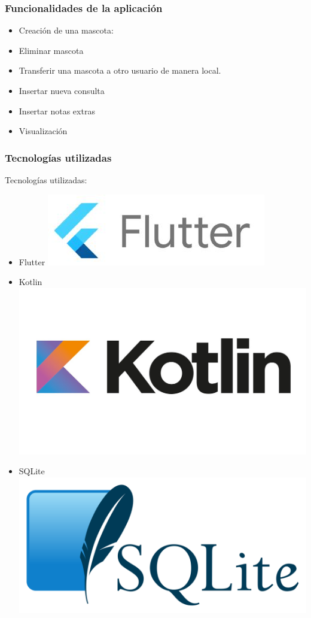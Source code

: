 \documentclass[14pt]{beamer}
\begin{document}
\begin{frame}
\frametitle{Funcionalidades de la aplicación}
\begin{itemize}
\item Creación de una mascota:
\item Eliminar mascota
\item Transferir una mascota a otro usuario de manera local.
\item Insertar nueva consulta
\item Insertar notas extras
\item Visualización
\end{itemize}

\end{frame}


\begin{frame}
\frametitle{Tecnologías utilizadas}

Tecnologías utilizadas:
\begin{itemize}
\item Flutter
\includegraphics[scale =0.32]{Images/LogodeFlutter.jpg}
\item Kotlin
\includegraphics[scale =0.08]{Images/LogoKotlin.jpg}
\item SQLite
\includegraphics[scale =0.07]{Images/LogodeSQLite.png}
\end{itemize}

\end{frame}
\end{document}
